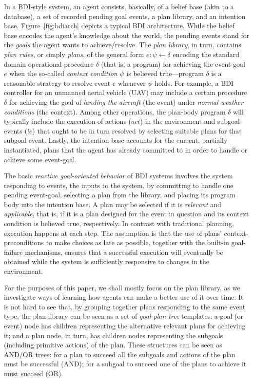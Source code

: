 In a BDI-style system, an agent consists, basically, of a belief base (akin to a
database), a set of recorded pending goal events, a plan library, and an
intention base.
Figure~\ref{fig:bdiarch} depicts a typical BDI architecture.
While the belief base encodes the agent's knowledge about the world, the pending
events stand for the \emph{goals} the agent wants to achieve/resolve.
The \textit{plan library}, in turn, contains \emph{plan rules}, or simply
\emph{plans}, of the general form $e: \psi \leftarrow \delta$ encoding the
standard domain operational procedure $\delta$ (that is, a program) for achieving
the event-goal $e$ when the so-called \textit{context condition} $\psi$ is
believed true---program $\delta$ is a reasonable strategy to resolve event $e$
whenever $\psi$ holds.
For example, a BDI controller for an unmanned aerial vehicle (UAV)
\cite{Karim:AAMAS05,Ziming:AAC07} may include a certain procedure $\delta$ for
achieving the goal of \emph{landing the aircraft} (the event) under \emph{normal
weather conditions} (the context).
Among other operations, the plan-body program $\delta$ will typically include the
execution of actions ($act$) in the environment and subgoal events ($!e$) that
ought to be in turn resolved by selecting suitable plans for that subgoal event.
Lastly, the intention base accounts for the current, partially instantiated,
plans that the agent has already committed to in order to handle or achieve some
event-goal.


The basic \emph{reactive goal-oriented behavior} of BDI systems involves the
system responding to events, the inputs to the system, by committing to handle
one pending event-goal, selecting a plan from the library, and placing its
program body  into the intention base.
A plan may be selected if it is \textit{relevant} and \textit{applicable}, that
is, if it is a plan designed for the event in question and its context condition
is believed true, respectively.
In contrast with traditional planning, execution happens at each step. The
assumption is that the use of plans' context-preconditions to make choices as
late as possible, together with the built-in goal-failure mechanisms, ensures
that a successful execution will eventually be obtained while the system is
sufficiently responsive to changes in the environment.

For the purposes of this paper, we shall mostly focus on the plan library, as we
investigate ways of learning how agents can make a better use of it over time.
It is not hard to see that, by grouping together plans responding to the same
event type, the plan library can be seen as a set of \emph{goal-plan tree}
templates: a goal (or event) node has children representing the alternative
relevant plans for achieving it; and a plan node, in turn, has children nodes
representing the subgoals (including primitive actions) of the plan.
These structures can be seen as AND/OR trees: for a plan to succeed all the
subgoals and actions of the plan must be successful (AND); for a subgoal to
succeed one of the plans to achieve it must succeed (OR).





